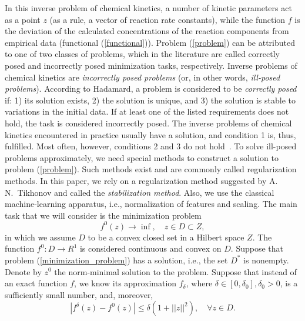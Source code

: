 \documentclass{svproc}
\begin{document}
In this inverse problem of chemical kinetics, a number of kinetic parameters act as a point $z$ (as a rule, a vector of reaction rate constants), while the function $f$ is the deviation of the calculated concentrations of the reaction components from empirical data (functional (\ref{functional})).
Problem (\ref{problem}) can be attributed to one of two classes of problems, which in the literature are called correctly posed and incorrectly posed minimization tasks, respectively. Inverse problems of chemical kinetics are \emph{incorrectly posed problems}  (or, in other words, \emph{ill-posed problems}). According to Hadamard, a problem is considered to be \emph{correctly posed} if: 1) its solution exists, 2) the solution is unique, and 3) the solution is stable to variations in the initial data. If at least one of the listed requirements does not hold, the task is considered incorrectly posed. The inverse problems of chemical kinetics encountered in practice usually have a solution, and condition 1 is, thus, fulfilled. Most often, however, conditions 2 and 3 do not hold~\cite{regularization}.
To solve ill-posed problems approximately, we need special methods to construct a solution to problem (\ref{problem}). Such methods exist and are commonly called regularization methods. In this paper, we rely on a regularization method suggested by A.\,N.~Tikhonov and called the \emph{stabilization method}. Also, we use the classical machine-learning apparatus, i.e., normalization of features and scaling.
The main task that we will consider is the minimization problem
\begin{equation}
f^0(z) \rightarrow \inf,\quad z \in D \subset Z,
\label{minimization_problem}
\end{equation}
in which we assume $D$ to be a convex closed set in a Hilbert space $Z$. The function $f^0\colon D \rightarrow R^1$ is considered continuous and convex on $D$. Suppose that problem (\ref{minimization_problem}) has a solution, i.e., the set $D^*$ is nonempty. Denote by $z^0$ the norm-minimal solution to the problem. Suppose that instead of an exact function $f$, we know its approximation $f_{\delta}$, where $\delta \in [0, \delta_0], \delta_0>0$, is a sufficiently small number, and, moreover,
\begin{equation}
|f^\delta(z) - f^0(z)| \leq \delta (1+||z||^2),\quad  \forall z \in D.
\end{equation}
\end{document}
